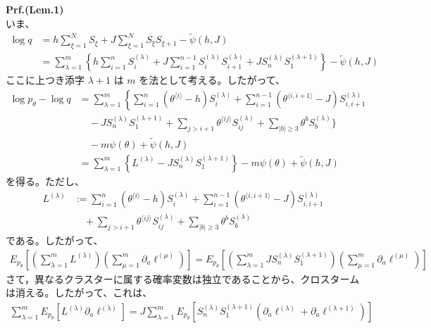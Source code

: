 \documentclass[a4paper,11pt]{jsarticle}
\numberwithin{equation}{section}
\begin{document}
\textbf{Prf.(Lem.1)}\\
いま、
\begin{align}
\log q &= h \sum_{\xi=1}^{N} S_{\xi} + J \sum_{\xi=1}^{N} S_{\xi} S_{\xi+1} - \tilde{\psi}(h, J) \\
&= \sum_{\lambda=1}^{m} \left\{ h \sum_{i=1}^{n} S_{i}^{(\lambda)} + J \sum_{i=1}^{n-1} S_{i}^{(\lambda)} S_{i+1}^{(\lambda)} + J S_{n}^{(\lambda)} S_{1}^{(\lambda+1)} \right\} - \tilde{\psi}(h, J)
\end{align}
ここに上つき添字 $\lambda+1$ は $m$ を法として考える。したがって、
\begin{align}
\log p_{\theta} - \log q &= \sum_{\lambda=1}^{m} \left\{ \sum_{i=1}^{n} \left( \theta^{\langle i \rangle} - h \right) S_{i}^{(\lambda)} + \sum_{i=1}^{n-1} \left( \theta^{\langle i,i+1 \rangle} - J \right) S_{i,i+1}^{(\lambda)} \right. \\
&\quad - J S_{n}^{(\lambda)} S_{1}^{(\lambda+1)} + \sum_{j > i+1} \theta^{\langle ij \rangle} S_{ij}^{(\lambda)} + \sum_{|b| \geq 3} \theta^b S_b^{(\lambda)} \Bigg\} \\
&\quad - m \psi(\theta) + \tilde{\psi}(h, J) \\
&= \sum_{\lambda=1}^{m} \left\{ L^{(\lambda)} - J S_{n}^{(\lambda)} S_{1}^{(\lambda+1)} \right\} - m \psi(\theta) + \tilde{\psi}(h, J)
\end{align}
を得る。ただし、
\begin{align}
    L^{(\lambda)} &:= \sum_{i=1}^{n} \left( \theta^{\langle i \rangle} - h \right) S_{i}^{(\lambda)} + \sum_{i=1}^{n-1} \left( \theta^{\langle i,i+1 \rangle} - J \right) S_{i,i+1}^{(\lambda)} \\
    &\quad + \sum_{j > i+1} \theta^{\langle ij \rangle} S_{ij}^{(\lambda)} + \sum_{|b| \geq 3} \theta^b S_b^{(\lambda)}
\end{align}
である。したがって、
\begin{align}
    E_{p_\theta} \left[ \left( \sum_{\lambda=1}^{m} L^{(\lambda)} \right) \left( \sum_{\mu=1}^{m} \partial_a \ell^{(\mu)} \right) \right] = E_{p_\theta} \left[ \left( \sum_{\lambda=1}^{m} J S_{n}^{(\lambda)} S_{1}^{(\lambda+1)} \right) \left( \sum_{\mu=1}^{m} \partial_a \ell^{(\mu)} \right) \right]
\end{align}    
さて，異なるクラスターに属する確率変数は独立であることから、クロスタームは消える。したがって、これは、
\begin{align}
    \sum_{\lambda=1}^{m} E_{p_\theta} \left[ L^{(\lambda)} \partial_a \ell^{(\lambda)} \right] = J \sum_{\lambda=1}^{m} E_{p_\theta} \left[ S_{n}^{(\lambda)} S_{1}^{(\lambda+1)} \left( \partial_a \ell^{(\lambda)} + \partial_a \ell^{(\lambda+1)} \right) \right] 
\end{align}
\end{document}
